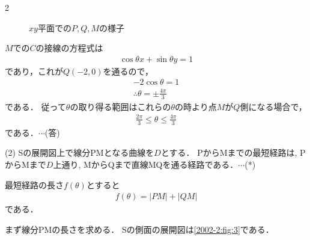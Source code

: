 \documentclass[../../main.tex]{subfiles}
\begin{document}
\begin{multicols}{2}
\begin{figure}[H]
    \caption{$xy$平面での$P,Q,M$の様子}
    \label{2002-2:fig:2}
  \end{figure}

  $M$での$C$の接線の方程式は
  \begin{align*}
    \cos\theta x + \sin\theta y = 1
  \end{align*}
  であり，これが$Q(-2,0)$を通るので，
  \begin{align*}
    -2\cos\theta = 1 \\
    \therefore
    \theta = \pm \frac{4\pi}{3}
  \end{align*}
  である．
  従って$\theta$の取り得る範囲はこれらの$\theta$の時より点$M$が$Q$側になる場合で，
  \begin{align*}
    \frac{2\pi}{3} \le \theta \le \frac{4\pi}{3}
  \end{align*}
  である．$\cdots$(答)

  \vspace{10pt}
  (2)
  Sの展開図上で線分PMとなる曲線を$D$とする．
  PからMまでの最短経路は, PからMまで$D$上通り,
  MからQまで直線MQを通る経路である．$\cdots$(*)

  最短経路の長さ$f(\theta)$とすると
  \begin{align}
    f(\theta) = |PM| + |QM|\label{2002-2:eq:1}
  \end{align}
  である．

  まず線分PMの長さを求める．
  Sの側面の展開図は\cref{2002-2:fig:3}である．

  \begin{figure}[H]
    \centering
\end{figure}
\end{multicols}
\end{document}
